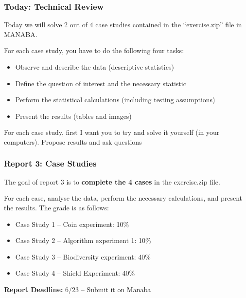 \documentclass[t]{beamer}
\begin{document}
\begin{frame}
  \frametitle{Today: Technical Review}

  Today we will solve 2 out of 4 case studies contained in the
  ``exercise.zip'' file in MANABA.

  \bigskip
  
  For each case study, you have to do the following four tasks:
  \begin{itemize}
  \item Observe and describe the data (descriptive statistics)
  \item Define the question of interest and the necessary statistic
  \item Perform the statistical calculations (including testing assumptions)
  \item Present the results (tables and images)
  \end{itemize}
  
  For each case study, first I want you to try and solve it yourself
  (in your computers).  Propose results and ask questions
  
\end{frame}

\begin{frame}
  \frametitle{Report 3: Case Studies}

  The goal of report 3 is to {\bf complete the 4 cases} in the
  exercise.zip file.

  \bigskip

  For each case, analyse the data, perform the necessary calculations,
  and present the results. The grade is as follows:

  \begin{itemize}
  \item Case Study 1 -- Coin experiment: 10\%
  \item Case Study 2 -- Algorithm experiment 1: 10\%
  \item Case Study 3 -- Biodiversity experiment: 40\%
  \item Case Study 4 -- Shield Experiment: 40\%
  \end{itemize}
  
  \begin{block}{}
    {\bf Report Deadline:} 6/23 -- Submit it on Manaba
  \end{block}
\end{frame}
\end{document}
